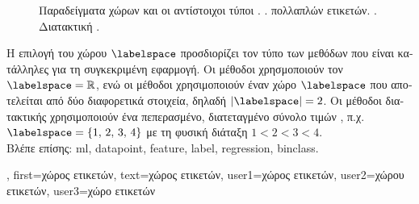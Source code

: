 {{\begin{figure}[H]
		{
		\caption{\label{fig_label_spaces_dict} \foreignlanguage{greek}{Παραδείγματα χώρων}  \foreignlanguage{greek}{και οι 
			αντίστοιχοι τύποι} .  .  
			 \foreignlanguage{greek}{πολλαπλών ετικετών}.  . 
			 \foreignlanguage{greek}{Διατακτική} .} }
		\end{figure}
		\foreignlanguage{greek}{Η επιλογή του χώρου}  $\labelspace$ \foreignlanguage{greek}{προσδιορίζει τον τύπο των 
		μεθόδων}  \foreignlanguage{greek}{που είναι κατάλληλες για τη συγκεκριμένη εφαρμογή. Οι μέθοδοι}  
		\foreignlanguage{greek}{χρησμοποιούν τον} $\labelspace = \mathbb{R}$, \foreignlanguage{greek}{ενώ οι μέθοδοι}  
		\foreignlanguage{greek}{χρησιμοποιούν έναν χώρο}  $\labelspace$ \foreignlanguage{greek}{που αποτελείται από δύο 
		διαφορετικά στοιχεία, δηλαδή $|\labelspace|=2$. Οι μέθοδοι διατακτικής}  \foreignlanguage{greek}{χρησιμοποιούν 
		ένα πεπερασμένο, διατεταγμένο σύνολο τιμών} , \foreignlanguage{greek}{π.χ. $\labelspace = \{1,\,2,\,3,\,4\}$ με τη 
		φυσική διάταξη $1 < 2 < 3 < 4$.}
		\\
		\foreignlanguage{greek}{Βλέπε επίσης:} \gls{ml}, \gls{datapoint}, \gls{feature}, \gls{label}, \gls{regression}, \gls{binclass}.}, 
	first={\foreignlanguage{greek}{χώρος ετικετών}},
	text={\foreignlanguage{greek}{χώρος ετικετών}},
	user1={\foreignlanguage{greek}{χώρος ετικετών}}, %
  	user2={\foreignlanguage{greek}{χώρου ετικετών}}, %
	user3={\foreignlanguage{greek}{χώρο ετικετών}} %
}


